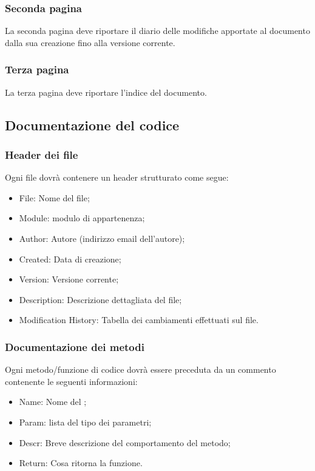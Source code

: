 \subsubsection{Seconda pagina}
\label{5.2.4}
La seconda pagina deve riportare il diario delle modifiche apportate al documento dalla sua creazione fino alla versione corrente.

\subsubsection{Terza pagina}
\label{5.2.5}
La terza pagina deve riportare l'indice del documento.

\subsection{Documentazione del codice}
\label{5.3}

\subsubsection{Header dei file}
\label{5.3.1}
Ogni file dovrà contenere un header strutturato come segue:
\begin{itemize}
\item File: Nome del file;
\item Module: modulo di appartenenza;
\item Author: Autore (indirizzo email dell'autore);
\item Created: Data di creazione;
\item Version: Versione corrente;
\item Description: Descrizione dettagliata del file;
\item Modification History: Tabella dei cambiamenti effettuati sul file.
\end{itemize}

\subsubsection{Documentazione dei metodi}
\label{5.3.2}
Ogni metodo/funzione di codice dovrà essere preceduta da un commento contenente le seguenti informazioni:
\begin{itemize}
\item Name: Nome del ;
\item Param: lista del tipo dei parametri;
\item Descr: Breve descrizione del comportamento del metodo;
\item Return: Cosa ritorna la funzione.
\end{itemize}

